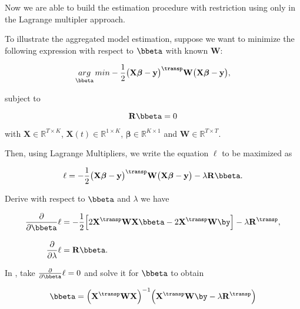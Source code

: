 Now we are able to build the estimation procedure with restriction using only  in the Lagrange multipler approach. 

To illustrate the aggregated model estimation, suppose we want to minimize the following expression with respect to $\bbeta$ with known $\mathbf{W}$:

\begin{equation}
  \underset{\bbeta}{arg}\, min
  -\frac{1}{2}
  \bigl(
  \mathbf{X} \boldsymbol \beta
  -
  \mathbf{y}
  \bigr)^\transp
  \mathbf{W}
    \bigl(
  \mathbf{X} \boldsymbol \beta
  -
  \mathbf{y}
  \bigr),
\end{equation}

\noindent subject to

\begin{equation}
\mathbf{R}\bbeta = 0
\end{equation}


\noindent with $\mathbf{X} \in \mathbb{R}^{T \times K}$, $\mathbf{X}(t) \in \mathbb{R}^{1 \times K}$, $\boldsymbol \beta \in \mathbb{R}^{K \times 1}$ and $\mathbf{W} \in \mathbb{R}^{T \times T}$. 

Then, using Lagrange Multipliers, we write the equation $\ell$ to be maximized as

\begin{equation}
  \label{eq:ap:lagr}
  \ell
  =
    -\frac{1}{2}
  \bigl(
  \mathbf{X} \boldsymbol \beta
  -
  \mathbf{y}
  \bigr)^\transp
  \mathbf{W}
    \bigl(
  \mathbf{X} \boldsymbol \beta
  -
  \mathbf{y}
  \bigr)
  -
  \lambda
  \mathbf{R}\bbeta.
\end{equation}

Derive  with respect to $\bbeta$ and $\lambda$ we have

\begin{align}
  \frac{\partial}{\partial \bbeta} \ell
  &=
    -\frac{1}{2}
    \Bigl[
    2 \mathbf{X}^\transp \mathbf{W} \mathbf{X} \bbeta
    -
    2 \mathbf{X}^\transp \mathbf{W} \by
    \Bigr]
    -
    \lambda
    \mathbf{R}^\transp, \label{eq:partialbeta} \\[.3cm]
  \frac{\partial}{\partial \lambda} \ell
  &=
    \mathbf{R} \bbeta. \label{eq:partiallambda}
\end{align}

In , take $\frac{\partial}{\partial \bbeta} \ell = 0$ and solve it for $\bbeta$ to obtain

\begin{equation}
  \label{eq:betasol1}
  \bbeta
  =
  \Bigl(
  \mathbf{X}^\transp
  \mathbf{W}
  \mathbf{X}
  \Bigr)^{-1}
  \Bigl(
  \mathbf{X}^\transp
  \mathbf{W}
  \by
  -
  \lambda
  \mathbf{R}^\transp
  \Bigr)
\end{equation}


